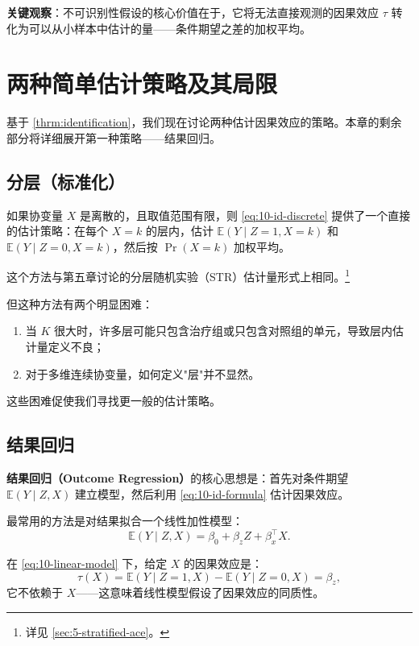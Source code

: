\textbf{关键观察}：不可识别性假设的核心价值在于，它将无法直接观测的因果效应 $\tau$ 转化为可以从小样本中估计的量——条件期望之差的加权平均。

\section{两种简单估计策略及其局限}\label{sec:10-estimation}

基于 \cref{thrm:identification}，我们现在讨论两种估计因果效应的策略。本章的剩余部分将详细展开第一种策略——结果回归。

\subsection{分层（标准化）}\label{sec:10-stratification}

如果协变量 $X$ 是离散的，且取值范围有限，则 \cref{eq:10-id-discrete} 提供了一个直接的估计策略：在每个 $X = k$ 的层内，估计 $\mathbb{E}(Y \mid Z = 1, X = k)$ 和 $\mathbb{E}(Y \mid Z = 0, X = k)$，然后按 $\Pr(X = k)$ 加权平均。

这个方法与第五章讨论的分层随机实验（STR）估计量形式上相同。\footnote{详见 \cref{sec:5-stratified-ace}。}

但这种方法有两个明显困难：
\begin{enumerate}
  \item 当 $K$ 很大时，许多层可能只包含治疗组或只包含对照组的单元，导致层内估计量定义不良；
  \item 对于多维连续协变量，如何定义"层"并不显然。
\end{enumerate}

这些困难促使我们寻找更一般的估计策略。

\subsection{结果回归}\label{sec:10-outcome-regression}

\textbf{结果回归（Outcome Regression）}的核心思想是：首先对条件期望 $\mathbb{E}(Y \mid Z, X)$ 建立模型，然后利用 \cref{eq:10-id-formula} 估计因果效应。

最常用的方法是对结果拟合一个线性加性模型：
\begin{equation}
\mathbb{E}(Y \mid Z, X) = \beta_0 + \beta_z Z + \beta_x^{\top} X.
\label{eq:10-linear-model}
\end{equation}

在 \cref{eq:10-linear-model} 下，给定 $X$ 的因果效应是：
\[
\tau(X) = \mathbb{E}(Y \mid Z = 1, X) - \mathbb{E}(Y \mid Z = 0, X) = \beta_z,
\]
它不依赖于 $X$——这意味着线性模型假设了因果效应的同质性。


